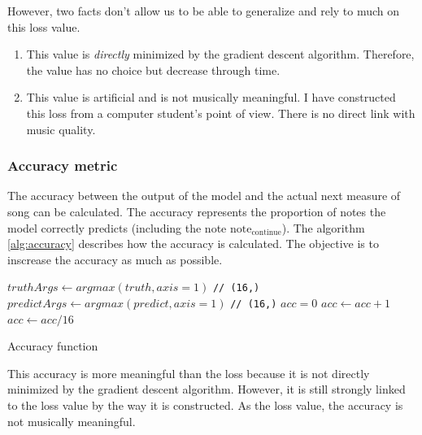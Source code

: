 \documentclass[12pt]{report}
\begin{document}
However, two facts don't allow us to be able to generalize and rely to much on this loss value.
\begin{enumerate}
    \item This value is \textit{directly} minimized by the gradient descent algorithm.
    Therefore, the value has no choice but decrease through time.
    \item This value is artificial and is not musically meaningful.
    I have constructed this loss from a computer student's point of view.
    There is no direct link with music quality.
\end{enumerate}

\subsubsection{Accuracy metric}

The accuracy between the output of the model and the actual next measure of song can be calculated.
The accuracy represents the proportion of notes the model correctly predicts (including the note $\text{note}_{\text{continue}}$).
The algorithm \ref{alg:accuracy} describes how the accuracy is calculated.
The objective is to inscrease the accuracy as much as possible.

\begin{algorithm}
    \begin{algorithmic}[1]
        \Statex
            \State $truthArgs \gets argmax(truth, axis=1)$ \texttt{// (16,)}
            \State $predictArgs \gets argmax(predict, axis=1)$ \texttt{// (16,)}
            \State $acc = 0$
                    \State $acc \gets acc + 1$
                \EndIf
            \EndFor
            \State $acc \gets acc / 16$
            \State {}
        \EndFunction
        \end{algorithmic}
    \caption{Accuracy function}
    \label{alg:accuracy}
\end{algorithm}

This accuracy is more meaningful than the loss because it is not directly minimized by the gradient descent algorithm.
However, it is still strongly linked to the loss value by the way it is constructed.
As the loss value, the accuracy is not musically meaningful.
\end{document}
